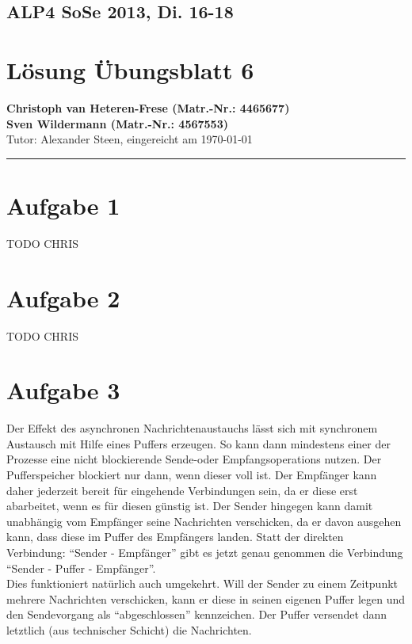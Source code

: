 \documentclass[11pt,a4paper,DIV=10,]{scrartcl}
\begin{document}
\subsection*{ALP4 SoSe 2013, Di. 16-18}
\section*{Lösung Übungsblatt 6}
\textbf{Christoph van Heteren-Frese (Matr.-Nr.: 4465677)} \\ \textbf{Sven Wildermann (Matr.-Nr.: 4567553)}\\
Tutor: Alexander Steen, eingereicht am \today\\
\hrule

\section*{Aufgabe 1}

TODO CHRIS
\section*{Aufgabe 2}

TODO CHRIS 
\section*{Aufgabe 3}
Der Effekt des asynchronen Nachrichtenaustauchs lässt sich mit synchronem Austausch mit Hilfe eines Puffers erzeugen. So kann dann mindestens einer der Prozesse eine nicht blockierende Sende-oder Empfangsoperations nutzen. Der Pufferspeicher blockiert nur dann, wenn dieser voll ist. Der Empfänger kann daher jederzeit bereit für eingehende Verbindungen sein, da er diese erst abarbeitet, wenn es für diesen günstig ist. Der Sender hingegen kann damit unabhängig vom Empfänger seine Nachrichten verschicken, da er davon ausgehen kann, dass diese im Puffer des Empfängers landen. 
Statt der direkten Verbindung: ``Sender - Empfänger'' gibt es jetzt genau genommen die Verbindung ``Sender - Puffer - Empfänger''.  \\
Dies funktioniert natürlich auch umgekehrt. Will der Sender zu einem Zeitpunkt mehrere Nachrichten verschicken, kann er diese in seinen eigenen Puffer legen und den Sendevorgang als ``abgeschlossen'' kennzeichen. Der Puffer versendet dann letztlich (aus technischer Schicht) die Nachrichten. 
\end{document}
